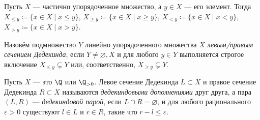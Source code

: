 \documentclass[
	extrafontsizes,
	11pt,
	hyphens,
]{memoir}
\begin{document}


\begin{notation}
Пусть \(X\) --- частично упорядоченное множество,
а \(y \in X\) --- его элемент.
Тогда \(X_{\leq y} \coloneqq \{x \in X \mid x \leq y\}\), \(X_{\geq y} \coloneqq \{x \in X \mid x \geq y\}\), \(X_{< y} \coloneqq \{x \in X \mid x < y\}\), \(X_{> y} \coloneqq \{x \in X \mid x > y\}\).
\end{notation}

\begin{definition}
Назовём подмножество \(Y\) линейно упорядоченного множества \(X\) \emph{левым/правым сечением Дедекинда}, если
\(Y \neq \varnothing, X\) и
для любого \(y \in Y\)
выполняется строгое включение
\(X_{\leq y} \varsubsetneq Y\)
или, соответственно,
\(X_{\geq y} \varsubsetneq Y\).
\end{definition}

\begin{definition}
Пусть \(X\) --- это \(\Q\) или \(\Q_{>0}\).
Левое сечение Дедекинда \(L \subset X\) и правое сечение Дедекинда \(R \subset X\) называются \emph{дедекиндовыми дополнениями} друг друга, а пара \((L,R)\) --- \emph{дедекиндовой парой}, если \(L \cap R = \varnothing\), и для любого рационального \(\varepsilon > 0\) существуют \(l \in L\) и \(r \in R\), такие что \(r - l \leq \varepsilon\).
\end{definition}
\end{document}
